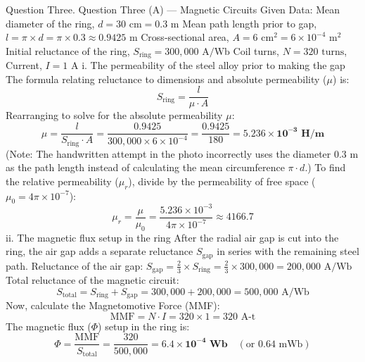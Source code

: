 Question Three.
Question Three (A) — Magnetic Circuits
Given Data:
Mean diameter of the ring, $d = 30\text{ cm} = 0.3\text{ m}$
Mean path length prior to gap, $l = \pi \times d = \pi \times 0.3 \approx 0.9425\text{ m}$
Cross-sectional area, $A = 6\text{ cm}^2 = 6 \times 10^{-4}\text{ m}^2$
Initial reluctance of the ring, $S_{\text{ring}} = 300,000\text{ A/Wb}$
Coil turns, $N = 320\text{ turns}$, Current, $I = 1\text{ A}$
i. The permeability of the steel alloy prior to making the gap
The formula relating reluctance to dimensions and absolute permeability ($\mu$) is:
$$S_{\text{ring}} = \frac{l}{\mu \cdot A}$$ 
Rearranging to solve for the absolute permeability $\mu$:
$$\mu = \frac{l}{S_{\text{ring}} \cdot A} = \frac{0.9425}{300,000 \times 6 \times 10^{-4}} = \frac{0.9425}{180} = \mathbf{5.236 \times 10^{-3}\text{ H/m}}$$ 
(Note: The handwritten attempt in the photo incorrectly uses the diameter $0.3\text{ m}$ as the path length instead of calculating the mean circumference $\pi \cdot d$.)
To find the relative permeability ($\mu_r$), divide by the permeability of free space ($\mu_0 = 4\pi \times 10^{-7}$):
$$\mu_r = \frac{\mu}{\mu_0} = \frac{5.236 \times 10^{-3}}{4\pi \times 10^{-7}} \approx \mathbf{4166.7}$$ 
ii. The magnetic flux setup in the ring
After the radial air gap is cut into the ring, the air gap adds a separate reluctance $S_{\text{gap}}$ in series with the remaining steel path.
Reluctance of the air gap: $S_{\text{gap}} = \frac{2}{3} \times S_{\text{ring}} = \frac{2}{3} \times 300,000 = 200,000\text{ A/Wb}$
Total reluctance of the magnetic circuit:
$$S_{\text{total}} = S_{\text{ring}} + S_{\text{gap}} = 300,000 + 200,000 = 500,000\text{ A/Wb}$$ 
Now, calculate the Magnetomotive Force (MMF):
$$\text{MMF} = N \cdot I = 320 \times 1 = 320\text{ A-t}$$ 
The magnetic flux ($\Phi$) setup in the ring is:
$$\Phi = \frac{\text{MMF}}{S_{\text{total}}} = \frac{320}{500,000} = \mathbf{6.4 \times 10^{-4}\text{ Wb}} \quad (\text{or } 0.64\text{ mWb})$$ 
